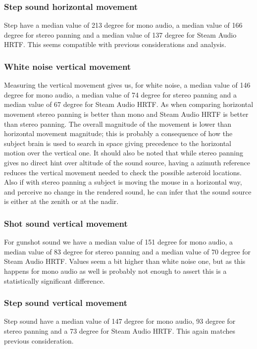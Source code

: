 \documentclass[conference]{IEEEtran}
\begin{document}
\subsubsection{Step sound horizontal movement}
Step have a median value of 213 degree for mono audio, a median value of 166 degree for stereo panning and a median value of 137 degree for Steam Audio HRTF. This seems compatible with previous considerations and analysis.\\

\subsubsection{White noise vertical movement}
Measuring the vertical movement gives us, for white noise, a median value of 146 degree for mono audio, a median value of 74 degree for stereo panning and a median value of 67 degree for Steam Audio HRTF.
As when comparing horizontal movement stereo panning is better than mono and Steam Audio HRTF is better than stereo panning. The overall magnitude of the movement is lower than horizontal movement magnitude; this is probably a consequence of how the subject brain is used to search in space giving precedence to the horizontal motion over the vertical one.
It should also be noted that while stereo panning gives no direct hint over altitude of the sound source, having a azimuth reference reduces the vertical movement needed to check the possible asteroid locations. Also if with stereo panning a subject is moving the mouse in a horizontal way, and perceive no change in the rendered sound, he can infer that the sound source is either at the zenith or at the nadir.\\

\subsubsection{Shot sound vertical movement}
For gunshot sound we have a median value of 151 degree for mono audio, a median value of 83 degree for stereo panning and a median value of 70 degree for Steam Audio HRTF. Values seem a bit higher than white noise one, but as this happens for mono audio as well is probably not enough to assert this is a statistically significant difference.\\

\subsubsection{Step sound vertical movement}
Step sound have a median value of 147 degree for mono audio, 93 degree for stereo panning and a 73 degree for Steam Audio HRTF. This again matches previous consideration.\\
\end{document}
